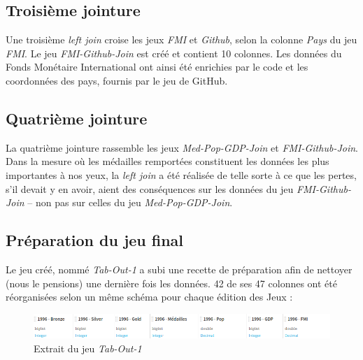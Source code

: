 \documentclass[hidelinks, 12pt]{report}
\begin{document}
%





\subsection{Troisième jointure}

Une troisième \textit{left join} croise les jeux \textit{FMI} et \textit{Github}, selon la colonne \textit{Pays} du jeu \textit{FMI}. Le jeu \textit{FMI-Github-Join} est créé et contient 10 colonnes. Les données du Fonds Monétaire International ont ainsi été enrichies par le code et les coordonnées des pays, fournis par le jeu de GitHub.





%





\subsection{Quatrième jointure}

La quatrième jointure rassemble les jeux \textit{Med-Pop-GDP-Join} et \textit{FMI-Github-Join}. Dans la mesure où les médailles remportées constituent les données les plus importantes à nos yeux, la \textit{left join} a été réalisée de telle sorte à ce que les pertes, s'il devait y en avoir, aient des conséquences sur les données du jeu \textit{FMI-Github-Join} -- non pas sur celles du jeu \textit{Med-Pop-GDP-Join}.





%





\subsection{Préparation du jeu final}

Le jeu créé, nommé \textit{Tab-Out-1} a subi une recette de préparation afin de nettoyer (nous le pensions) une dernière fois les données. \label{orga}42 de ses 47 colonnes ont été réorganisées selon un même schéma pour chaque édition des Jeux :

\begin{center}
	\begin{figure}[H]
		\setlength{\belowcaptionskip}{-35pt}
		\includegraphics[scale=0.5]{images/tab-out.png}
		\caption{Extrait du jeu \textit{Tab-Out-1}}
	\end{figure}
\end{center}
\end{document}

